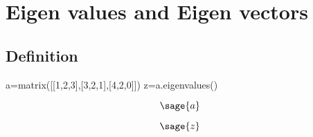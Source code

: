 \chapter{Eigen values and Eigen vectors}

\section{Definition}

\begin{sageblock}
        a=matrix([[1,2,3],[3,2,1],[4,2,0]])
        z=a.eigenvalues()
\end{sageblock}

$$\sage{a}$$

$$\sage{z}$$ 
